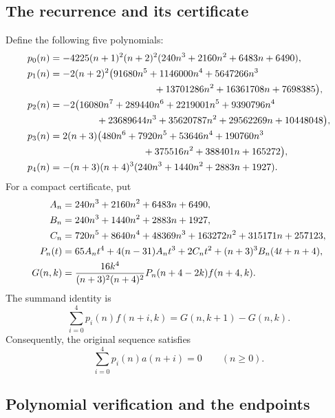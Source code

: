\documentclass[11pt,a4paper]{article}
\theoremstyle{remark}\newtheorem{remark}[theorem]{Remark}
\begin{document}
\subsection{The recurrence and its certificate}

Define the following five polynomials:
\begin{align}
 p_0(n)&=-4225(n+1)^2(n+2)^2
       (240n^3+2160n^2+6483n+6490),\label{rec:p0}\\
 p_1(n)&=-2(n+2)^2\bigl(91680n^5+1146000n^4+5647266n^3\notag\\
       &\hspace{38mm}{}+13701286n^2+16361708n+7698385\bigr),\label{rec:p1}\\
 p_2(n)&=-2\bigl(16080n^7+289440n^6+2219001n^5+9390796n^4\notag\\
       &\hspace{17mm}{}+23689644n^3+35620787n^2+29562269n
       +10448048\bigr),\label{rec:p2}\\
 p_3(n)&=2(n+3)\bigl(480n^6+7920n^5+53646n^4+190760n^3\notag\\
       &\hspace{34mm}{}+375516n^2+388401n+165272\bigr),\label{rec:p3}\\
 p_4(n)&=-(n+3)(n+4)^3(240n^3+1440n^2+2883n+1927).
       \label{rec:p4}
\end{align}
For a compact certificate, put
\begin{align}
 A_n&=240n^3+2160n^2+6483n+6490,\notag\\
 B_n&=240n^3+1440n^2+2883n+1927,\notag\\
 C_n&=720n^5+8640n^4+48369n^3+163272n^2+315171n+257123,
       \label{rec:abc}\\
 P_n(t)&=65A_nt^4+4(n-31)A_nt^3+2C_nt^2
          +(n+3)^3B_n(4t+n+4),\label{rec:P}\\
 G(n,k)&=\frac{16k^4}{(n+3)^2(n+4)^2}
            P_n(n+4-2k)f(n+4,k).\label{rec:G}
\end{align}
The summand identity is
\begin{equation}\label{rec:telescoper}
 \sum_{i=0}^{4}p_i(n)f(n+i,k)=G(n,k+1)-G(n,k).
\end{equation}
Consequently, the original sequence satisfies
\begin{equation}\label{rec:recurrence}
 \boxed{\displaystyle\sum_{i=0}^{4}p_i(n)a(n+i)=0
        \qquad(n\geq0).}
\end{equation}

\subsection{Polynomial verification and the endpoints}
\end{document}
